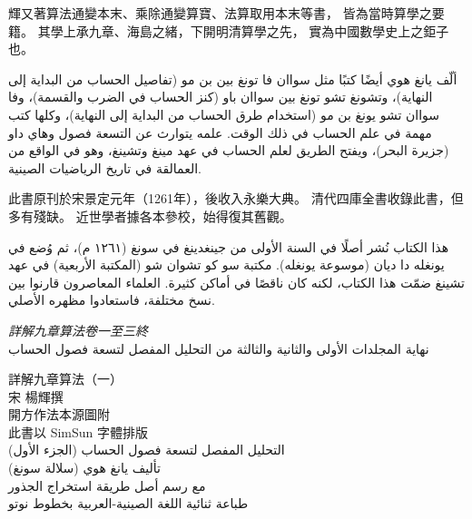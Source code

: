 \documentclass[11pt,a4paper]{article}
\newcommand{\ar}[1]{\arabicfont\beginR #1\endR}
\newcommand{\bilingualrow}[2]{%
\noindent\begin{minipage}[t]{0.48\textwidth}#1\end{minipage}\hfill\begin{minipage}[t]{0.48\textwidth}\arabicfont\beginR #2\endR\end{minipage}\par\vspace{0.5cm}}
\begin{document}
\bilingualrow{
輝又著算法通變本末、乘除通變算寶、法算取用本末等書，
皆為當時算學之要籍。
其學上承九章、海島之緒，下開明清算學之先，
實為中國數學史上之鉅子也。
}{
ألّف يانغ هوي أيضًا كتبًا مثل سواان فا تونغ بين بن مو (تفاصيل الحساب من البداية إلى النهاية)، وتشونغ تشو تونغ بين سواان باو (كنز الحساب في الضرب والقسمة)، وفا سواان تشو يونغ بن مو (استخدام طرق الحساب من البداية إلى النهاية)،
وكلها كتب مهمة في علم الحساب في ذلك الوقت.
علمه يتوارث عن التسعة فصول وهاي داو (جزيرة البحر)، ويفتح الطريق لعلم الحساب في عهد مينغ وتشينغ،
وهو في الواقع من العمالقة في تاريخ الرياضيات الصينية.
}

\bilingualrow{
此書原刊於宋景定元年（1261年），後收入永樂大典。
清代四庫全書收錄此書，但多有殘缺。
近世學者據各本參校，始得復其舊觀。
}{
هذا الكتاب نُشر أصلًا في السنة الأولى من جينغدينغ في سونغ (١٢٦١ م)، ثم وُضع في يونغله دا ديان (موسوعة يونغله).
مكتبة سو كو تشوان شو (المكتبة الأربعية) في عهد تشينغ ضمّت هذا الكتاب، لكنه كان ناقصًا في أماكن كثيرة.
العلماء المعاصرون قارنوا بين نسخ مختلفة، فاستعادوا مظهره الأصلي.
}

\vspace{1.5em}

\begin{flushright}
\textit{詳解九章算法卷一至三終}\\[0.5em]
\ar{نهاية المجلدات الأولى والثانية والثالثة من التحليل المفصل لتسعة فصول الحساب}
\end{flushright}

\vfill

\begin{center}
{\small 詳解九章算法（一）\\
宋 楊輝撰\\
開方作法本源圖附\\
此書以 SimSun 字體排版}\\[0.5em]
{\small \ar{التحليل المفصل لتسعة فصول الحساب (الجزء الأول)}\\
\ar{تأليف يانغ هوي (سلالة سونغ)}\\
\ar{مع رسم أصل طريقة استخراج الجذور}\\
\ar{طباعة ثنائية اللغة الصينية-العربية بخطوط نوتو}}
\end{center}
\end{document}
